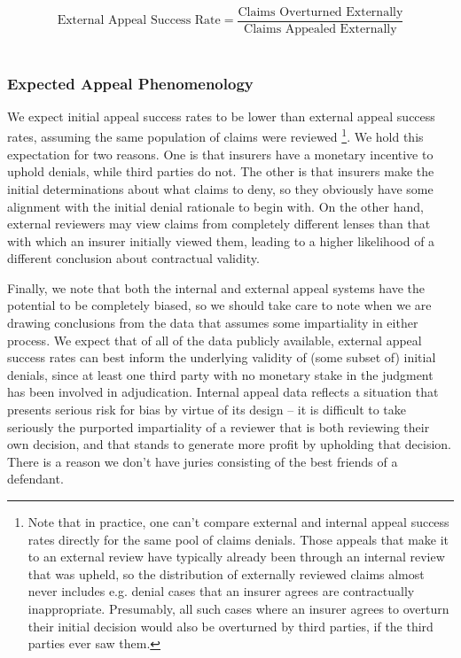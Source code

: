 \documentclass[12pt, a4paper,twoside,parskip=full]{report}
\theoremstyle{plain} %
\theoremstyle{definition} %
\theoremstyle{remark} %
\numberwithin{equation}{chapter}
\begin{document}
		\begin{equation*}
			\text{External Appeal Success Rate} = \dfrac{\text{Claims Overturned Externally}}{\text{Claims Appealed Externally}}
		\end{equation*}
		\hfill\\
		
		
		\subsubsection{Expected Appeal Phenomenology}
		
		We expect initial appeal success rates to be lower than external appeal success rates, assuming the same population of claims were reviewed \footnote{Note that in practice, one can't compare external and internal appeal success rates directly for the same pool of claims denials. Those appeals that make it to an external review have typically already been through an internal review that was upheld, so the distribution of externally reviewed claims almost never includes e.g. denial cases that an insurer agrees are contractually inappropriate. Presumably, all such cases where an insurer agrees to overturn their initial decision would also be overturned by third parties, if the third parties ever saw them.}. We hold this expectation for two reasons. One is that insurers have a monetary incentive to uphold denials, while third parties do not. The other is that insurers make the initial determinations about what claims to deny, so they obviously have some alignment with the initial denial rationale to begin with. On the other hand, external reviewers may view claims from completely different lenses than that with which an insurer initially viewed them, leading to a higher likelihood of a different conclusion about contractual validity.
		
		Finally, we note that both the internal and external appeal systems have the potential to be completely biased, so we should take care to note when we are drawing conclusions from the data that assumes some impartiality in either process. We expect that of all of the data publicly available, external appeal success rates can best inform the underlying validity of (some subset of) initial denials, since at least one third party with no monetary stake in the judgment has been involved in adjudication. Internal appeal data reflects a situation that presents serious risk for bias by virtue of its design -- it is difficult to take seriously the purported impartiality of a reviewer that is both reviewing their own decision, and that stands to generate more profit by upholding that decision. There is a reason we don't have juries consisting of the best friends of a defendant.
		
\end{document}
